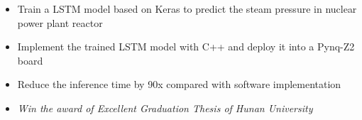 \documentclass{resume}
\begin{document}

\begin{itemize}
  \item Train a LSTM model based on Keras to predict the steam pressure in nuclear power plant reactor
  \item Implement the trained LSTM model with C++ and deploy it into a Pynq-Z2 board
  \item Reduce the inference time by 90x compared with software implementation
  \item \textit{Win the award of Excellent Graduation Thesis of Hunan University}
\end{itemize}



\end{document}
